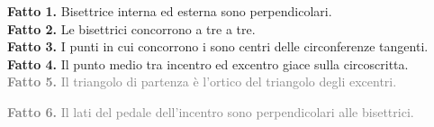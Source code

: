 \documentclass[a4paper]{article}
\theoremstyle{remark}
\theoremstyle{definition}
\begin{document}
\begin{multicols}{2}
\textbf{Fatto 1.} Bisettrice interna ed esterna sono perpendicolari. \\

\textbf{Fatto 2.} Le bisettrici concorrono a tre a tre. \\

\textbf{Fatto 3.} I punti in cui concorrono i sono centri delle circonferenze tangenti. \\

\textbf{Fatto 4.} Il punto medio tra incentro ed excentro giace sulla circoscritta. \\

\textcolor{gray}{\textbf{Fatto 5.} Il triangolo di partenza è l'ortico del triangolo degli excentri. \\
} %

\textcolor{gray}{\textbf{Fatto 6.} Il lati del pedale dell'incentro sono perpendicolari alle bisettrici.  \\
}

\end{multicols}
\end{document}
